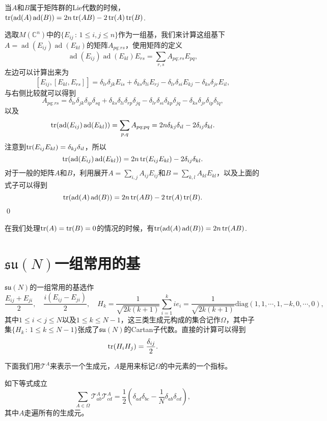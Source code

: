 \documentclass[9pt]{extarticle}
\newcommand{\cc}{\mathbb{C}}
\DeclareMathOperator{\ad}{ad}
\begin{document}
\pro 当$A$和$B$属于矩阵群的Lie代数的时候，$\tr(\ad(A)\ad(B))=2n \tr(AB) -2\tr(A)\tr(B)$.

\proof 选取$M(\cc^n)$中的$\{E_{ij}\,:\, 1\leq i,j\leq n\}$作为一组基，我们来计算这组基下$A=\ad(E_{ij})\ad(E_{kl})$的矩阵$A_{pq;rs}$，使用矩阵的定义
\[
\ad(E_{ij})\ad(E_{kl})E_{rs}=\sum_{r,s}A_{pq;rs}E_{pq},
\]
左边可以计算出来为
\[
[E_{ij},[E_{kl},E_{rs}]]=\delta_{lr}\delta_{jk}E_{is}+\delta_{ks}\delta_{li}E_{rj}-\delta_{lr}\delta_{si}E_{kj}-\delta_{ks}\delta_{jr}E_{il},
\]
与右侧比较就可以得到
\[
	A_{pq;rs}=\delta_{lr}\delta_{jk}\delta_{ip}\delta_{sq}+\delta_{ks}\delta_{li}\delta_{rp}\delta_{jq}-\delta_{lr}\delta_{si}\delta_{kp}\delta_{jq}-\delta_{ks}\delta_{jr}\delta_{ip}\delta_{lq},
\]
以及
\[
	\tr(\ad(E_{ij})\ad(E_{kl}))=\sum_{p,q}A_{pq;pq}=2n \delta_{kj}\delta_{il}-2\delta_{ij}\delta_{kl}.
\]
注意到$\operatorname{tr}(E_{ij}E_{kl})=\delta_{kj}\delta_{il}$，所以
\[
\tr(\ad(E_{ij})\ad(E_{kl}))=2n \tr(E_{ij}E_{kl}) -2\delta_{ij}\delta_{kl}.
\]
对于一般的矩阵$A$和$B$，利用展开$A=\sum_{i,j}A_{ij}E_{ij}$和$B=\sum_{k,l}A_{kl}E_{kl}$，以及上面的式子可以得到
\[
\tr(\ad(A)\ad(B))=2n \tr(AB) -2\tr(A)\tr(B).
\]\qed

在我们处理$\operatorname{tr}(A)=\operatorname{tr}(B)=0$的情况的时候，有$\tr(\ad(A)\ad(B))=2n \tr(AB)$. 

\clearpage
\section{$\mathfrak{su}(N)$一组常用的基}

$\mathfrak{su}(N)$的一组常用的基选作
\[
	\frac{E_{ij}+E_{ji}}{2},\quad \frac{i(E_{ij}-E_{ji})}{2},\quad H_k=\frac{1}{\sqrt{2k(k+1)}}\sum_{i=1}^{k} ie_{i}=\frac{1}{\sqrt{2k(k+1)}}
	\mathrm{diag}(1,1,\cdots,1,-k,0,\cdots,0),
\]
其中$1\leq i<j\leq N$以及$1\leq k \leq N-1$，这三类生成元构成的集合记作$\Omega$，其中子集$\{H_k\,:\,1\leq k \leq N-1\}$张成了$\mathfrak{su}(N)$的Cartan子代数。直接的计算可以得到
\[
	\operatorname{tr}(H_iH_j)=\frac{\delta_{ij}}{2}.
\]

下面我们用$\mathcal{T}^A$来表示一个生成元，$A$是用来标记$\Omega$的中元素的一个指标。

\pro 如下等式成立
\[
	\sum_{A\in \Omega}\mathcal{T}^A_{ab}\mathcal{T}^A_{cd}=\frac{1}{2}\left(\delta_{ad}\delta_{bc}-\frac{1}{N}\delta_{ab}\delta_{cd}\right),
\]
其中$A$走遍所有的生成元。
\end{document}
